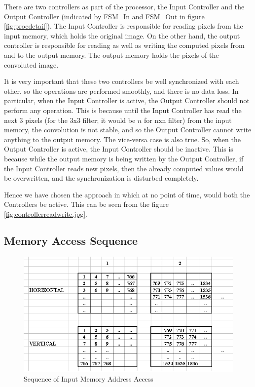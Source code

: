 \documentclass[11pt,a4paper]{article}
\begin{document}
There are two controllers as part of the processor, the Input Controller and the Output Controller (indicated by FSM\_In and FSM\_Out in figure \ref{fig:procdetail}). The Input Controller is responsible for reading pixels from the input memory, which holds the original image. On the other hand, the output controller is responsible for reading as well as writing the computed pixels from and to the output memory. The output memory holds the pixels of the convoluted image. 

It is very important that these two controllers be well synchronized with each other, so the operations are performed smoothly, and there is no data loss. In particular, when the Input Controller is active, the Output Controller should not perform any operation. This is because until the Input Controller has read the next 3 pixels (for the 3x3 filter; it would be $n$ for nxn filter) from the input memory, the convolution is not stable, and so the Output Controller cannot write anything to the output memory. The vice-versa case is also true. So, when the Output Controller is active, the Input Controller should be inactive. This is because while the output memory is being written by the Output Controller, if the Input Controller reads new pixels, then the already computed values would be overwritten, and the synchronization is disturbed completely.

Hence we have chosen the approach in which at no point of time, would both the Controllers be active. This can be seen from the figure \ref{fig:controllerreadwrite.jpg}.



\subsection{Memory Access Sequence}
\label{sec:memoryaccess}

\begin{figure}[h]
	\centering
		\includegraphics[width=5in]{./images/memoryAccess.PNG}
	\caption{Sequence of Input Memory Address Access}	
	\label{fig:memaccess}
\end{figure}
\end{document}
